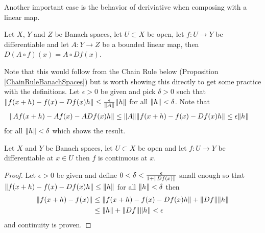 Another important case is the behavior of deriviative when composing
with a linear map.
\begin{examp}\label{FrechetDerivativeCompositionWithLinearMap}Let $X$, $Y$ and $Z$ be Banach spaces, let $U \subset X$
  be open, let $f : U \to Y$ be differentiable and let $A : Y \to Z$
  be a bounded linear map, then $D (A \circ f)(x) = A \circ Df(x)$.

Note that this would follow from the Chain Rule below (Proposition
\ref{ChainRuleBanachSpaces}) but is worth showing this directly to get
some practice with the definitions.  Let $\epsilon > 0$ be given and
pick $\delta>0$ such that $\lVert f(x+h) - f(x) - Df(x)h \rVert \leq
\frac{\epsilon}{\lVert A \rVert} \lVert h \rVert$ for all $\lVert h \rVert < \delta$.  Note
that
\begin{align*}
\lVert Af(x+h) - Af(x) - A Df(x)h \rVert &\leq \lVert A \rVert \lVert f(x+h) - f(x) -
                                    Df(x)h \rVert \leq \epsilon \lVert h \rVert
\end{align*}
for all $\lVert h \rVert < \delta$ which shows the result.
\end{examp}

\begin{prop}\label{DifferentiabilityImpliesContinuity}Let $X$ and $Y$ be Banach spaces, let $U \subset X$ be
  open and let $f : U \to Y$ be differentiable at $x \in U$ then $f$
  is continuous at $x$.
\end{prop}
\begin{proof}
Let $\epsilon > 0$ be given and define $0 < \delta < \frac{\epsilon}{1 + \lVert Df(x) \rVert}$ small enough so
that $\lVert f(x+h) - f(x) - Df(x)h \rVert \leq \lVert h \rVert$ for all $\lVert h \rVert <
\delta$ then 
\begin{align*}
\lVert f(x + h) - f(x) \rVert &\leq \lVert f(x + h) - f(x) - Df(x)h \rVert +
                         \lVert Df \rVert\lVert h \rVert \\
&\leq \lVert h \rVert + \lVert Df \rVert\lVert h \rVert < \epsilon
\end{align*}
and continuity is proven.
\end{proof}


